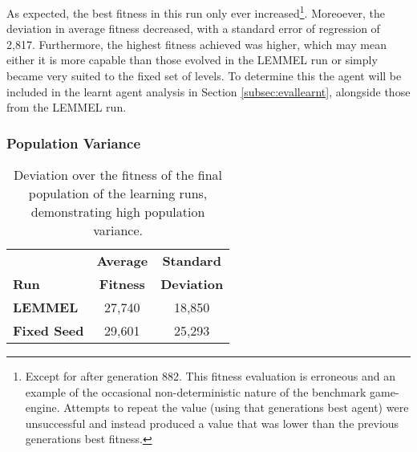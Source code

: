 
As expected, the best fitness in this run only ever increased\footnote{Except for after generation 882. This fitness evaluation is erroneous and an example of the occasional non-deterministic nature of the benchmark game-engine. Attempts to repeat the value (using that generations best agent) were unsuccessful and instead produced a value that was lower than the previous generations best fitness.}. Moreoever, the deviation in average fitness decreased, with a standard error of regression of 2,817. Furthermore, the highest fitness achieved was higher, which may mean either it is more capable than those evolved in the LEMMEL run or simply became very suited to the fixed set of levels. To determine this the agent will be included in the learnt agent analysis in Section \ref{subsec:evallearnt}, alongside those from the LEMMEL run.

\subsubsection{Population Variance}

\begin{table}
  \begin{adjustwidth}{-0cm}{-0cm}
  \begin{center} \small
    \begin{tabular}{ | l | c | c |}
    \hline
    & \textbf{Average} & \textbf{Standard} \Tstrut \\
    \textbf{Run} & \textbf{Fitness} & \textbf{Deviation}  \Bstrut \\ \thickhline
    
    \textbf{LEMMEL} & 27,740 & 18,850 \\ \hline
    \textbf{Fixed Seed} & 29,601 & 25,293 \\ \hline
    
    \end{tabular}
  \end{center}
  \end{adjustwidth}
  \caption{\small Deviation over the fitness of the final population of the learning runs, demonstrating high population variance.}
  \label{tab:popvar}
\end{table}


